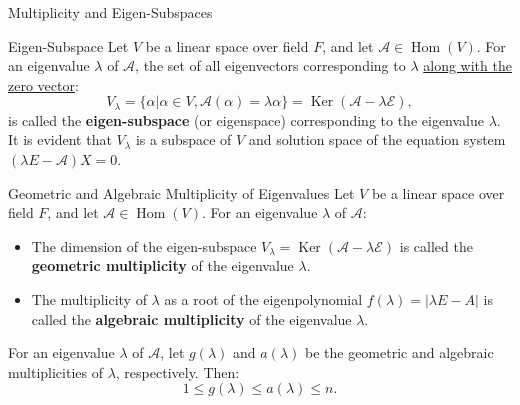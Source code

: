 \documentclass[11pt]{../../TexTemplate/elegantbook} %
\begin{document}
\begin{leftbarTitle}{Multiplicity and Eigen-Subspaces}\end{leftbarTitle}
\begin{definition}{Eigen-Subspace}
    Let \( V \) be a linear space over field \( F \), 
    and let \( \mathcal{A}\in \operatorname{Hom}(V) \).
    For an eigenvalue \( \lambda \) of \( \mathcal{A} \), 
    the set of all eigenvectors corresponding to \( \lambda \) \underline{along with the zero vector}:
    \[
    V_{\lambda} = \{ \alpha | \alpha \in V, \mathcal{A}(\alpha) = \lambda \alpha \} = 
    \operatorname{Ker}(\mathcal{A} - \lambda \mathcal{E}),
    \]
    is called the \textbf{eigen-subspace} (or eigenspace) corresponding to the eigenvalue \( \lambda \).
    It is evident that \( V_{\lambda} \) is a subspace of \( V \)
    and solution space of the equation system \( ( \lambda E - \mathcal{A})X = 0 \).
\end{definition}

\begin{definition}{Geometric and Algebraic Multiplicity of Eigenvalues}
    Let \( V \) be a linear space over field \( F \), 
    and let \( \mathcal{A}\in \operatorname{Hom}(V) \).
    For an eigenvalue \( \lambda \) of \( \mathcal{A} \):
    \begin{itemize}
        \item The dimension of the eigen-subspace \( V_{\lambda} = \operatorname{Ker}(\mathcal{A} - \lambda \mathcal{E}) \)
            is called the \textbf{geometric multiplicity} of the eigenvalue \( \lambda \).
        \item The multiplicity of \( \lambda \) as a root of the eigenpolynomial \( f(\lambda) = |\lambda E - A| \)
            is called the \textbf{algebraic multiplicity} of the eigenvalue \( \lambda \).
    \end{itemize}
\end{definition}

\begin{property}
    For an eigenvalue \( \lambda \) of \( \mathcal{A} \),
    let \( g(\lambda) \) and \( a(\lambda) \) be the geometric and algebraic multiplicities of \( \lambda \), respectively.
    Then:
    \[
    1 \leqslant g(\lambda) \leqslant a(\lambda) \leqslant n.
    \]
\end{property}
\end{document}
